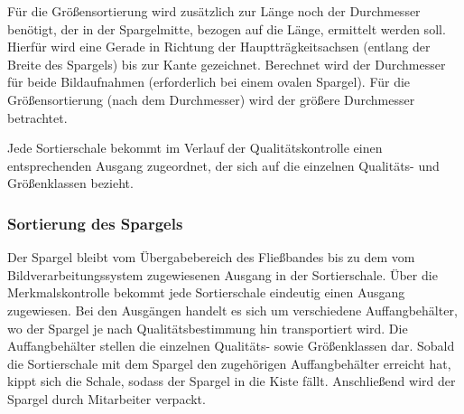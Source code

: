 \documentclass{ezb}
\begin{document}
Für die Größensortierung wird zusätzlich zur Länge noch der Durchmesser benötigt, der in der Spargelmitte, bezogen auf die Länge, ermittelt werden soll. Hierfür wird eine Gerade in Richtung der Hauptträgkeitsachsen (entlang der Breite des Spargels) bis zur Kante gezeichnet. Berechnet wird der Durchmesser für beide Bildaufnahmen (erforderlich bei einem ovalen Spargel). Für die Größensortierung (nach dem Durchmesser) wird der größere Durchmesser betrachtet.

Jede Sortierschale bekommt im Verlauf der Qualitätskontrolle einen entsprechenden Ausgang zugeordnet, der sich auf die einzelnen Qualitäts- und Größenklassen bezieht.

\subsubsection*{Sortierung des Spargels}
Der Spargel bleibt vom Übergabebereich des Fließbandes bis zu dem vom Bildverarbeitungssystem zugewiesenen Ausgang in der Sortierschale. Über die Merkmalskontrolle bekommt jede Sortierschale eindeutig einen Ausgang zugewiesen. Bei den Ausgängen handelt es sich um verschiedene Auffangbehälter, wo der Spargel je nach Qualitätsbestimmung
hin transportiert wird. Die Auffangbehälter stellen die einzelnen Qualitäts- sowie Größenklassen dar. 
Sobald die Sortierschale mit dem Spargel den zugehörigen Auffangbehälter erreicht
hat, kippt sich die Schale, sodass der Spargel in die Kiste fällt. 
Anschließend wird der Spargel durch Mitarbeiter verpackt.

\newpage
\end{document}
